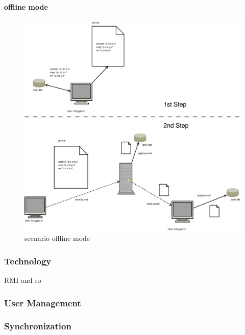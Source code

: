 \paragraph{offline mode}

\begin{figure}[h!]
\centering
\includegraphics[width=1\textwidth]{figures/scenario_offline_mode.eps}
\caption{scenario offline mode}
\label{fig:scenario_offline_mode}
\end{figure}

\subsubsection{Technology}
RMI and so
\subsubsection{User Management}
\subsubsection{Synchronization}